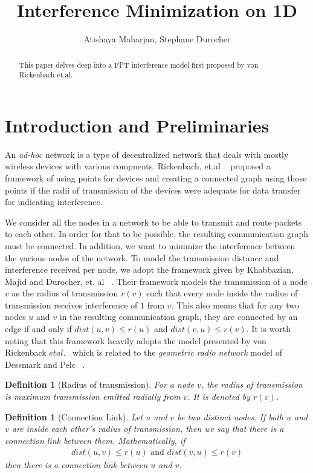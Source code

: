 \documentclass{article}
\title{Interference Minimization on 1D}
\author{Atishaya Maharjan, Stephane Durocher}
\newtheorem{definition}[theorem]{Definition}
\begin{document}
\maketitle

\begin{abstract}
	This paper delves deep into a FPT interference model first proposed by von Rickenbach et.al.
\end{abstract}

\section{Introduction and Preliminaries}

An \textit{ad-hoc} network is a type of decentralized network that deals with mostly wireless devices with various compnents. Rickenbach, et.al ~\cite{1420165} proposed a framework of using points for devices and creating a connected graph using those points if the radii of transmission of the devices were adequate for data transfer for indicating interference.

We consider all the nodes in a network to be able to transmit and route packets to each other. In order for that to be possible, the resulting communication graph must be connected. In addition, we want to minimize the interference between the various nodes of the network. To model the transmission distance and interference received per node, we adopt the framework given by  Khabbazian, Majid and Durocher, et. al ~\cite{6809218}. Their framework models the transmission of a node $v$ as the radius of transmission $r(v)$ such that every node inside the radius of transmission receives interference of $1$ from $v$. This also means that for any two nodes $u$ and $v$ in the resulting communication graph, they are connected by an edge if and only if $dist(u, v) \leq r(u)$ and $dist(v, u) \leq r(v)$. It is worth noting that this framework heavily adopts the model presented by von Rickenback $et al.$~\cite{1420165} which is related to the \textit{geometric radio network} model of Dessmark and Pelc ~\cite{DessmarkAnders2001Tbka}.

\begin{definition}[Radius of transmission]
	For a node $v$, the radius of transmission is maximum transmission emitted radially from $v$. It is denoted by $r(v)$.
\end{definition}

\begin{definition}[Connection Link]
	Let $u$ and $v$ be two distinct nodes. If both $u$ and $v$ are inside each other's radius of transmission, then we say that there is a connection link between them. Mathematically, if
	\begin{align*}
		dist(u,v) \leq r(u) \text{ and } dist(v, u) \leq r(v)
	\end{align*}
	then there is a connection link between $u$ and $v$.
\end{definition}
\end{document}

